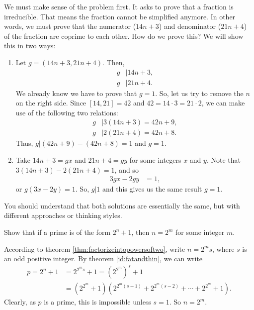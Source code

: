 \documentclass{subfile}
\begin{document}
	\begin{solution}
		We must make sense of the problem first. It asks to prove that a fraction is irreducible. That means the fraction cannot be simplified anymore. In other words, we must prove that the numerator ($14n+3$) and denominator ($21n+4$) of the fraction are coprime to each other. How do we prove this? We will show this in two ways:
		\begin{enumerate}
			\item Let $g=(14n+3,21n+4)$. Then,
			\begin{align*}
				g & |14n+3,\\
				g & |21n+4.
			\end{align*}
		We already know we have to prove that $g=1$. So, let us try to remove the $n$ on the right side. Since $[14,21]=42$ and $42=14\cdot3=21\cdot2$, we can make use of the following two relations:
			\begin{align*}
				g & |3(14n+3) = 42n+9,\\
				g & | 2(21n+4)= 42n+8.
			\end{align*}
		Thus, $g|(42n+9)-(42n+8)=1$ and $g=1$.

			\item Take $14n+3=gx$ and $21n+4=gy$ for some integers $x$ and $y$. Note that $3(14n+3)-2(21n+4) = 1$, and so
			\begin{align*}
				 3gx-2gy  & = 1,
			\end{align*}
		or $g(3x-2y) = 1.$ So, $g|1$ and this gives us the same result $g=1$.
		\end{enumerate}
	\end{solution}

	\begin{remark}
		You should understand that both solutions are essentially the same, but with different approaches or thinking styles.
	\end{remark}

	\begin{problem}\label{prob:prime=poweroftwoplusone}
		Show that if a prime is of the form $2^n+1$, then $n=2^m$ for some integer $m$.
	\end{problem}

	\begin{solution}
		According to theorem \eqref{thm:factorizeintopowersoftwo}, write $n=2^ms$, where $s$ is an odd positive integer. By theorem \eqref{id:fatandthin}, we can write
			\begin{align*}
				p = 2^n+1 &= 2^{2^{m}s}+1 = \left(2^{2^{m}}\right)^s+1\\
				   		  &=\left(2^{2^m}+1\right)\left(2^{2^{m}(s-1)}+2^{2^{m}(s-2)}+ \cdots + 2^{2^{m}}+1\right).
			\end{align*}
		Clearly, as $p$ is a prime, this is impossible unless $s=1$. So $n=2^m$.
	\end{solution}
\end{document}
